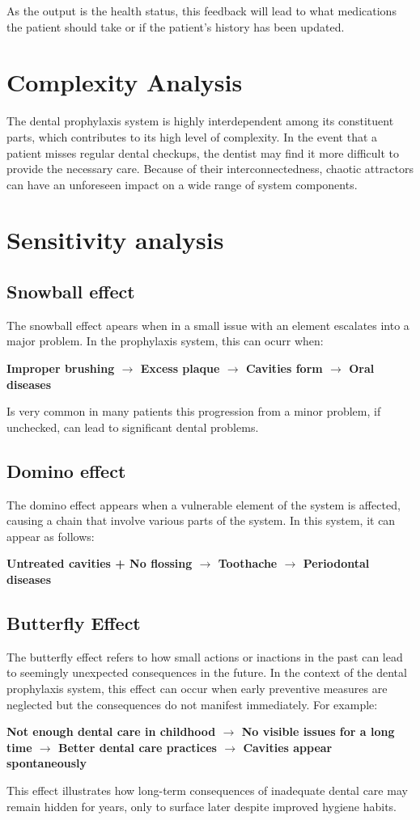 \documentclass[12pt]{article}
\begin{document}
As the output is the health status, this feedback will lead to what medications the patient should take or if the patient's history has been updated.

\section*{Complexity Analysis}

The dental prophylaxis system is highly interdependent among its constituent parts, which contributes to its high level of complexity. In the event that a patient misses regular dental checkups, the dentist may find it more difficult to provide the necessary care. Because of their interconnectedness, chaotic attractors can have an unforeseen impact on a wide range of system components.


\section*{Sensitivity analysis}
\subsection*{Snowball effect}
The snowball effect apears when in a small issue with an element escalates into a major problem. In the prophylaxis system, this can ocurr when:

\textbf{Improper brushing $\rightarrow$ Excess plaque $\rightarrow$ Cavities form $\rightarrow$ Oral diseases}

Is very common in many patients this progression from a minor problem, if unchecked, can lead to significant dental problems.

\subsection*{Domino effect}
The domino effect appears when a vulnerable element of the system is affected, causing a chain that involve various parts of the system. In this system, it can appear as follows:

\textbf{Untreated cavities + No flossing $ \rightarrow $ Toothache $ \rightarrow $ Periodontal diseases}

\subsection*{Butterfly Effect}
The butterfly effect refers to how small actions or inactions in the past can lead to seemingly unexpected consequences in the future. In the context of the dental prophylaxis system, this effect can occur when early preventive measures are neglected but the consequences do not manifest immediately. For example:

\textbf{Not enough dental care in childhood $\rightarrow$ No visible issues for a long time $\rightarrow$ Better dental care practices $\rightarrow$ Cavities appear spontaneously}

This effect illustrates how long-term consequences of inadequate dental care may remain hidden for years, only to surface later despite improved hygiene habits.
\end{document}
